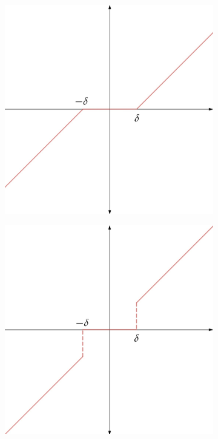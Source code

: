\begin{figure}
\centering
	\begin{subfigure}{0.4\textwidth}
	\centering
	\includegraphics[width = \textwidth]{figures/soft_thresholding.jpg}
	\label{hard_thresholding}
	\end{subfigure}\hspace{1cm}
	\begin{subfigure}{0.4\textwidth}
	\centering
	\includegraphics[width = \textwidth]{figures/hard_thresholding.jpg}

\end{subfigure}
\end{figure}
